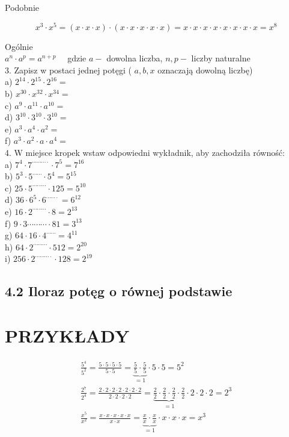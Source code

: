 \documentclass[10pt]{article}
\begin{document}
Podobnie

\[
x^{3} \cdot x^{5}=(x \cdot x \cdot x) \cdot(x \cdot x \cdot x \cdot x \cdot x)=x \cdot x \cdot x \cdot x \cdot x \cdot x \cdot x \cdot x=x^{8}
\]

Ogólnie\\
\(a^{n} \cdot a^{p}=a^{n+p} \quad\) gdzie \(a-\) dowolna liczba, \(n, p-\) liczby naturalne\\
3. Zapisz w postaci jednej potęgi ( \(a, b, x\) oznaczają dowolną liczbę)\\
a) \(2^{14} \cdot 2^{15} \cdot 2^{16}=\)\\
b) \(x^{30} \cdot x^{32} \cdot x^{34}=\)\\
c) \(a^{9} \cdot a^{11} \cdot a^{10}=\)\\
d) \(3^{10} \cdot 3^{10} \cdot 3^{10}=\)\\
e) \(a^{3} \cdot a^{4} \cdot a^{2}=\)\\
f) \(a^{3} \cdot a^{2} \cdot a \cdot a^{4}=\)\\
4. W miejsce kropek wstaw odpowiedni wykładnik, aby zachodziła równość:\\
a) \(7^{4} \cdot 7^{\cdots \cdots \cdots \cdot} \cdot 7^{5}=7^{16}\)\\
b) \(5^{3} \cdot 5^{\cdots \cdots} \cdot 5^{4}=5^{15}\)\\
c) \(25 \cdot 5^{\cdots \cdots \cdots} \cdot 125=5^{10}\)\\
d) \(36 \cdot 6^{5} \cdot 6^{\cdots \cdots \cdot}=6^{12}\)\\
e) \(16 \cdot 2^{\cdots \cdots \cdots} \cdot 8=2^{13}\)\\
f) \(9 \cdot 3 \cdots \cdots \cdots \cdot 81=3^{13}\)\\
g) \(64 \cdot 16 \cdot 4^{\cdots \cdots}=4^{11}\)\\
h) \(64 \cdot 2^{\cdots \cdots \cdots} \cdot 512=2^{20}\)\\
i) \(256 \cdot 2^{\cdots \cdots \cdots \cdot} \cdot 128=2^{19}\)

\subsection*{4.2 Iloraz potęg o równej podstawie}
\section*{PRZYKŁADY}
\[
\begin{gathered}
\frac{5^{4}}{5^{2}}=\frac{5 \cdot 5 \cdot 5 \cdot 5}{5 \cdot 5}=\underbrace{\frac{5}{5} \cdot \frac{5}{5}}_{=1} \cdot 5 \cdot 5=5^{2} \\
\frac{2^{7}}{2^{4}}=\frac{2 \cdot 2 \cdot 2 \cdot 2 \cdot 2 \cdot 2 \cdot 2}{2 \cdot 2 \cdot 2 \cdot 2}=\underbrace{\frac{2}{2} \cdot \frac{2}{2} \cdot \frac{2}{2} \cdot \frac{2}{2}}_{=1} \cdot 2 \cdot 2 \cdot 2=2^{3} \\
\frac{x^{5}}{x^{2}}=\frac{x \cdot x \cdot x \cdot x \cdot x}{x \cdot x}=\underbrace{\frac{x}{x} \cdot \frac{x}{x}}_{=1} \cdot x \cdot x \cdot x=x^{3}
\end{gathered}
\]
\end{document}
